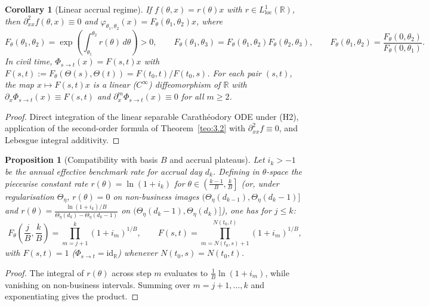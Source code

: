 \documentclass[11pt, a4paper]{article}
\theoremstyle{definition}
\theoremstyle{plain}
\newtheorem{proposicao}[definicao]{Proposition}
\newtheorem{corolario}[definicao]{Corollary}
\theoremstyle{remark}
\begin{document}
\begin{corolario}[Linear accrual regime]\label{cor:3.4}
If $f(\theta, x) = r(\theta)x$ with $r \in L^1_{\text{loc}}(\mathbb{R})$, then $\partial_{xx}^2 f(\theta, x) \equiv 0$ and $\varphi_{\theta_1, \theta_2}(x) = F_\theta(\theta_1, \theta_2)x$, where
\[
F_\theta(\theta_1, \theta_2) = \exp\left(\int_{\theta_1}^{\theta_2} r(\theta)\,d\theta\right) > 0, \qquad F_\theta(\theta_1, \theta_3) = F_\theta(\theta_1, \theta_2) F_\theta(\theta_2, \theta_3), \qquad F_\theta(\theta_1, \theta_2) = \frac{F_\theta(0, \theta_2)}{F_\theta(0, \theta_1)}.
\]
In civil time, $\Phi_{s \to t}(x) = F(s,t)x$ with $F(s,t) := F_\theta(\Theta(s), \Theta(t)) = F(t_0, t)/F(t_0, s)$. For each pair $(s,t)$, the map $x \mapsto F(s,t)x$ is a linear ($C^\infty$) diffeomorphism of $\mathbb{R}$ with $\partial_x \Phi_{s \to t}(x) \equiv F(s,t)$ and $\partial_x^m \Phi_{s \to t}(x) \equiv 0$ for all $m \ge 2$.
\end{corolario}
\begin{proof}
Direct integration of the linear separable Carathéodory ODE under (H2), application of the second-order formula of Theorem~\ref{teo:3.2} with $\partial_{xx}^2 f \equiv 0$, and Lebesgue integral additivity.
\end{proof}

\begin{proposicao}[Compatibility with basis $B$ and accrual plateaus]\label{prop:3.5}
Let $i_k > -1$ be the annual effective benchmark rate for accrual day $d_k$. Defining in $\theta$-space the piecewise constant rate $r(\theta) = \ln(1 + i_k)$ for $\theta \in \left(\frac{k-1}{B}, \frac{k}{B}\right]$ (or, under regularisation $\Theta_\eta$, $r(\theta) = 0$ on non-business images $(\Theta_\eta(d_{k-1}), \Theta_\eta(d_k - 1)]$ and $r(\theta) = \frac{\ln(1+i_k)/B}{\Theta_\eta(d_k) - \Theta_\eta(d_k - 1)}$ on $(\Theta_\eta(d_k - 1), \Theta_\eta(d_k)]$), one has for $j \le k$:
\[
F_\theta\left(\frac{j}{B}, \frac{k}{B}\right) = \prod_{m = j+1}^{k} (1 + i_m)^{1/B}, \qquad F(s,t) = \prod_{m = N(t_0, s) + 1}^{N(t_0, t)} (1 + i_m)^{1/B},
\]
with $F(s,t) = 1$ ($\Phi_{s \to t} = \mathrm{id}_{\mathbb{R}}$) whenever $N(t_0, s) = N(t_0, t)$.
\end{proposicao}
\begin{proof}
The integral of $r(\theta)$ across step $m$ evaluates to $\frac{1}{B}\ln(1 + i_m)$, while vanishing on non-business intervals. Summing over $m = j+1, \dots, k$ and exponentiating gives the product.
\end{proof}
\end{document}
